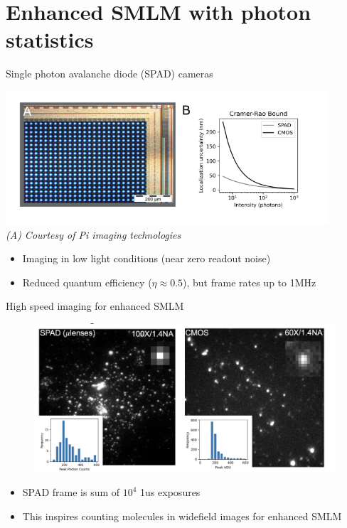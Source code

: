 \documentclass{beamer}					%
\begin{document}
\section{Enhanced SMLM with photon statistics}

\begin{frame}{Single photon avalanche diode (SPAD) cameras}

\includegraphics[width=12cm]{SPAD-Intro.png}\\
\textit{(A) Courtesy of Pi imaging technologies}
\vspace{0.05in}
\begin{itemize}
\item Imaging in low light conditions (near zero readout noise)
\item Reduced quantum efficiency ($\eta\approx 0.5$), but frame rates up to 1MHz
\end{itemize}


\end{frame}

\begin{frame}{High speed imaging for enhanced SMLM}
\begin{figure}
\includegraphics[width=12cm]{SPADvCMOS.png}
\end{figure}
\begin{itemize}
\item SPAD frame is sum of $10^{4}$ 1us exposures
\item This inspires counting molecules in widefield images for enhanced SMLM
\end{itemize}
\end{frame}
\end{document}

